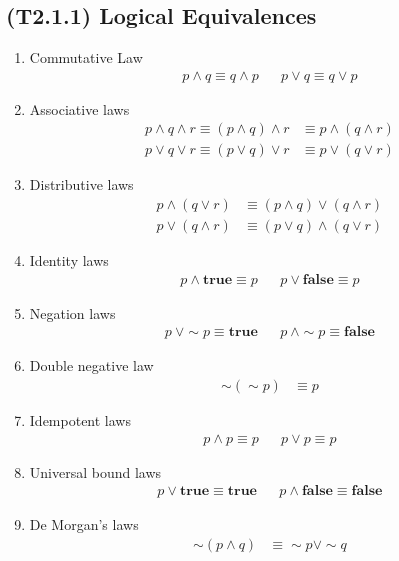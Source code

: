 \documentclass[landscape, a4paper]{article}
\newcommand{\Or}{\vee}
\newcommand{\true}{\textbf{true}}
\newcommand{\false}{\textbf{false}}
\renewcommand{\and}{\wedge}
\newcommand{\customsection}[1]{
    \vspace*{-16pt}
    \section*{#1}
    \vspace*{-4pt}
}
\newenvironment{wenumerate}{\begin{enumerate}[wide, labelindent=2pt]}{\end{enumerate}}
\begin{document}
\begin{multicols*}{4}
    \customsection{(T2.1.1) Logical Equivalences}
    \begin{wenumerate}
        \item Commutative Law
        \begin{align*}
            p \and q\equiv q \and p &  & p \Or q\equiv q \Or p
        \end{align*}
        \item Associative laws
        \begin{align*}
            p \and q \and r \equiv (p \and q) \and r & \equiv p \and (q \and r) \\
            p \Or q \Or r \equiv (p \Or q) \Or r     & \equiv p \Or (q \Or r)
        \end{align*}
        \item Distributive laws
        \begin{align*}
            p \and (q \Or r) & \equiv (p \and q) \Or (q \and r) \\
            p \Or (q \and r) & \equiv (p \Or q) \and (q \Or r)
        \end{align*}
        \item Identity laws
        \begin{align*}
            p \and \true \equiv p &  & p \Or \false  \equiv p
        \end{align*}
        \item Negation laws
        \begin{align*}
            p\ \Or {\sim} p\equiv \true &  & p\ \and {\sim} p  \equiv \false
        \end{align*}
        \item Double negative law
        \begin{align*}
            {\sim}({\sim} p) & \equiv p
        \end{align*}
        \item Idempotent laws
        \begin{align*}
            p \and p \equiv p &  & p \Or p \equiv p
        \end{align*}
        \item Universal bound laws
        \begin{align*}
            p \Or \true \equiv \true &  & p \and \false \equiv \false
        \end{align*}
        \item De Morgan’s laws
        \begin{align*}
            {\sim}(p \and q) & \equiv {\sim} p \Or {\sim} q  \\

\end{align*}
\end{wenumerate}
\end{multicols*}
\end{document}
